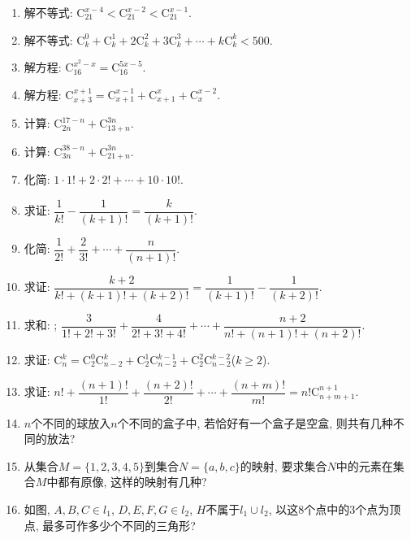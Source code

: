 \documentclass[10pt,a4paper]{article}
\begin{document}
\begin{enumerate}[1.]
\item 解不等式: $\mathrm{C}_{21}^{x-4}<\mathrm{C}_{21}^{x-2}<\mathrm{C}_{21}^{x-1}$.
\item 解不等式: $\mathrm{C}_k^0+\mathrm{C}_k^1+2\mathrm{C}_k^2+3\mathrm{C}_k^3+\cdots +k\mathrm{C}_k^k<500$.
\item 解方程: $\mathrm{C}_{16}^{x^2-x}=\mathrm{C}_{16}^{5x-5}$.
\item 解方程: $\mathrm{C}_{x+3}^{x+1}=\mathrm{C}_{x+1}^{x-1}+\mathrm{C}_{x+1}^x+\mathrm{C}_x^{x-2}$.
\item 计算: $\mathrm{C}_{2n}^{17-n}+\mathrm{C}_{13+n}^{3n}$.
\item 计算: $\mathrm{C}_{3n}^{38-n}+\mathrm{C}_{21+n}^{3n}$.
\item 化简: $1\cdot 1!+2\cdot 2!+\cdots +10\cdot 10!$.
\item 求证: $\dfrac 1{k!}-\dfrac 1{(k+1)!}=\dfrac k{(k+1)!}$.
\item 化简: $\dfrac 1{2!}+\dfrac 2{3!}+\cdots +\dfrac n{(n+1)!}$.
\item 求证: $\dfrac{k+2}{k!+(k+1)!+(k+2)!}=\dfrac 1{(k+1)!}-\dfrac 1{(k+2)!}$.
\item 求和: ; $\dfrac 3{1!+2!+3!}+\dfrac 4{2!+3!+4!}+\cdots +\dfrac{n+2}{n!+(n+1)!+(n+2)!}$.
\item 求证: $\mathrm{C}_n^k=\mathrm{C}_2^0\mathrm{C}_{n-2}^k+\mathrm{C}_2^1\mathrm{C}_{n-2}^{k-1}+\mathrm{C}_2^2\mathrm{C}_{n-2}^{k-2}$($k\ge 2$).
\item 求证: $n!+\dfrac{(n+1)!}{1!}+\dfrac{(n+2)!}{2!}+\cdots +\dfrac{(n+m)!}{m!}=n!\mathrm{C}_{n+m+1}^{n+1}$.
\item $n$个不同的球放入$n$个不同的盒子中, 若恰好有一个盒子是空盒, 则共有几种不同的放法?
\item 从集合$M=\{1,2,3,4,5\}$到集合$N=\{a,b,c\}$的映射, 要求集合$N$中的元素在集合$M$中都有原像, 这样的映射有几种?
\item 如图, $A,B,C\in l_1$, $D,E,F,G\in l_2$, $H$不属于$l_1\cup l_2$, 以这$8$个点中的$3$个点为顶点, 最多可作多少个不同的三角形?
\begin{center}
\end{center}
\end{enumerate}
\end{document}
